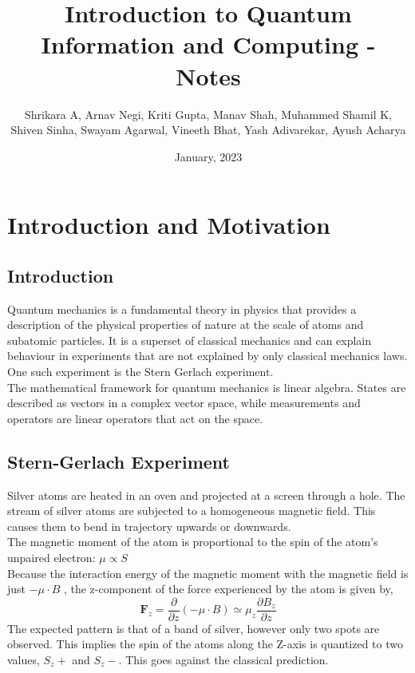 \documentclass{article}
\title{Introduction to Quantum Information and Computing - Notes}
\author{Shrikara A, Arnav Negi, Kriti Gupta, Manav Shah, Muhammed Shamil K,\\ Shiven Sinha, Swayam Agarwal, Vineeth Bhat, Yash Adivarekar, Ayush Acharya} %
\date{January, 2023}
\begin{document}
\maketitle
\vfill
\tableofcontents
\newpage
{}


\section{Introduction and Motivation}
\subsection{Introduction}

Quantum mechanics is a fundamental theory in physics that provides a description of the physical properties of nature at the scale of atoms and subatomic particles. It is a superset of classical mechanics and can explain
behaviour in experiments that are not explained by only classical mechanics laws. One such experiment is
the Stern Gerlach experiment.\\

The mathematical framework for quantum mechanics is linear algebra. States are described as vectors in a complex
vector space, while measurements and operators are linear operators that act on the space.\\


\subsection{Stern-Gerlach Experiment}

Silver atoms are heated in an oven and projected at a screen through a hole. The stream of silver atoms
are subjected to a homogeneous magnetic field. This causes them to bend in trajectory upwards or downwards.\\

The magnetic moment of the atom is proportional to the spin of the atom's unpaired electron: $\mu \propto S$\\

Because the interaction energy of the magnetic moment with the magnetic field
is just $-\mu \cdot B$ , the z-component of the force experienced by the atom is given by,
$$\textbf{F}_z = \frac{\partial}{\partial z}(-\mu \cdot B) \simeq \mu_z\frac{\partial B_z}{\partial z}$$
The expected pattern is that of a band of silver, however only two spots are observed. This implies
the spin of the atoms along the Z-axis is quantized to two values, $S_z+$ and $S_z-$. This goes against the classical prediction.
\end{document}
